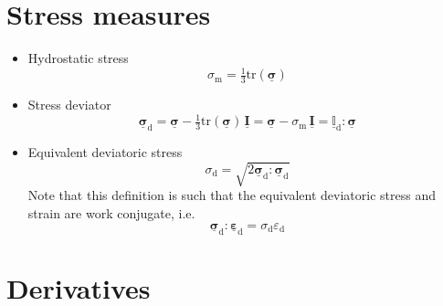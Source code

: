 \documentclass[times,namecite]{goose-article}
\newcommand\T[1]{\underline{\bm{{#1}}}}
\newcommand\TT[1]{\underline{\mathbb{{#1}}}}
\begin{document}
\section{Stress measures}
\label{sec:nomenclature::stress}

\begin{itemize}
%
\item Hydrostatic stress
\begin{equation}
  \sigma_\mathrm{m} = \tfrac{1}{3} \mathrm{tr} ( \T{\sigma} )
\end{equation}
%
\item Stress deviator
%
\begin{equation}
  \T{\sigma}_\mathrm{d}
  = \T{\sigma} - \tfrac{1}{3} \mathrm{tr} ( \T{\sigma} ) \, \T{I}
  = \T{\sigma} - \sigma_\mathrm{m} \, \T{I}
  = \TT{I}_\mathrm{d} : \T{\sigma}
\end{equation}
%
\item Equivalent deviatoric stress
\begin{equation}
\sigma_\mathrm{d} = \sqrt{2 \T{\sigma}_\mathrm{d} : \T{\sigma}_\mathrm{d} }
\end{equation}
Note that this definition is such that the equivalent deviatoric stress and strain are work conjugate, i.e.
\begin{equation}
  \T{\sigma}_\mathrm{d} : \T{\varepsilon}_\mathrm{d} = \sigma_\mathrm{d} \varepsilon_\mathrm{d}
\end{equation}
%
\end{itemize}

\section{Derivatives}
\label{sec:nomenclature:derivatives}
\end{document}
